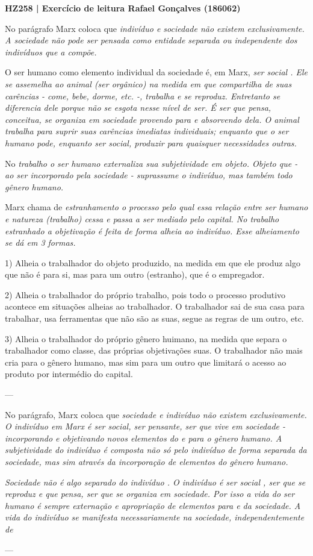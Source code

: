 \documentclass[12pt]{article}
\begin{document}
\noindent
\large\textbf{HZ258 | Exercício de leitura \hfill Rafael Gonçalves (186062)}
\break\hfill

No parágrafo Marx coloca que \em indivíduo \em e \em sociedade \em não existem exclusivamente.
A sociedade não pode ser pensada como entidade separada ou independente dos indivíduos que a compõe.

O ser humano como elemento individual da sociedade é, em Marx, \em ser social \em.
Ele se assemelha ao \em animal \em (ser orgânico) na medida em que compartilha de suas carências - come, bebe, dorme, etc. -, trabalha e se reproduz.
Entretanto se diferencia dele porque não se esgota nesse nível de ser.
É ser que pensa, conceitua, se organiza em sociedade provendo para e absorvendo dela.
O animal \em trabalha \em para suprir suas carências imediatas individuais; enquanto que o ser humano pode, enquanto ser social, produzir para quaisquer necessidades outras.

No \em trabalho \em o ser humano externaliza sua subjetividade em objeto.
Objeto que - ao ser incorporado pela sociedade - suprassume o indivíduo, mas também todo gênero humano.

Marx chama de \em estranhamento \em o processo pelo qual essa relação entre ser humano e natureza (trabalho) cessa e passa a ser mediado pelo capital.
No \em trabalho estranhado \em a objetivação é feita de forma alheia ao indivíduo.
Esse alheiamento se dá em 3 formas.

1) Alheia o trabalhador do objeto produzido, na medida em que ele produz algo que não é para si, mas para um outro (estranho), que é o empregador.

2) Alheia o trabalhador do próprio trabalho, pois todo o processo produtivo acontece em situações alheias ao trabalhador.
O trabalhador sai de sua casa para trabalhar, usa ferramentas que não são as suas, segue as regras de um outro, etc.

3) Alheia o trabalhador do próprio gênero huimano, na medida que separa o trabalhador como classe, das próprias objetivações suas. O trabalhador não mais cria para o gênero humano, mas sim para um outro que limitará o acesso ao produto por intermédio do capital.


--- 


No parágrafo, Marx coloca que \em sociedade \em e \em indivíduo \em não existem exclusivamente.
O indivíduo em Marx é ser social, ser pensante, ser que vive em sociedade - incorporando e  objetivando novos elementos do e para o gênero humano.
A subjetividade do indivíduo é composta não só pelo indivíduo de forma separada da sociedade, mas sim através da incorporação de elementos do gênero humano.

\em Sociedade \em não é algo separado do \em indivíduo \em.
O indivíduo é \em ser social \em, ser que se reproduz e que pensa, ser que se organiza em sociedade.
Por isso a vida do ser humano é sempre externação e apropriação de elementos para e da sociedade.
A vida do indivíduo se manifesta necessariamente na sociedade, independentemente de 

---
\end{document}
